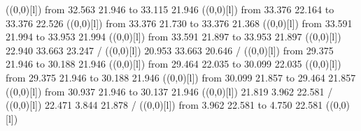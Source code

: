 {%
\linethickness=1pt
\setplotsymbol ({\makebox(0,0)[l]{\tencirc{}}})
{\color[rgb]{0,0,0}\putrule from 32.563 21.946 to 33.115 21.946
}%
%
%
\linethickness=1pt
\setplotsymbol ({\makebox(0,0)[l]{\tencirc{}}})
{\color[rgb]{0,0,0}\putrule from 33.376 22.164 to 33.376 22.526
}%
%
%
\linethickness=1pt
\setplotsymbol ({\makebox(0,0)[l]{\tencirc{}}})
{\color[rgb]{0,0,0}\putrule from 33.376 21.730 to 33.376 21.368
}%
%
%
\linethickness=1pt
\setplotsymbol ({\makebox(0,0)[l]{\tencirc{}}})
{\color[rgb]{0,0,0}\putrule from 33.591 21.994 to 33.953 21.994
}%
%
%
\linethickness=1pt
\setplotsymbol ({\makebox(0,0)[l]{\tencirc{}}})
{\color[rgb]{0,0,0}\putrule from 33.591 21.897 to 33.953 21.897
}%
%
%
\linethickness=1pt
\setplotsymbol ({\makebox(0,0)[l]{\tencirc{}}})
{\color[rgb]{0,0,0} 22.940 33.663 23.247 /
}%
%
%
\linethickness=1pt
\setplotsymbol ({\makebox(0,0)[l]{\tencirc{}}})
{\color[rgb]{0,0,0} 20.953 33.663 20.646 /
}%
%
%
\linethickness=1pt
\setplotsymbol ({\makebox(0,0)[l]{\tencirc{}}})
{\color[rgb]{0,0,0}\putrule from 29.375 21.946 to 30.188 21.946
}%
%
%
\linethickness=1pt
\setplotsymbol ({\makebox(0,0)[l]{\tencirc{}}})
{\color[rgb]{0,0,0}\putrule from 29.464 22.035 to 30.099 22.035
}%
%
%
\linethickness=1pt
\setplotsymbol ({\makebox(0,0)[l]{\tencirc{}}})
{\color[rgb]{0,0,0}\putrule from 29.375 21.946 to 30.188 21.946
}%
%
%
\linethickness=1pt
\setplotsymbol ({\makebox(0,0)[l]{\tencirc{}}})
{\color[rgb]{0,0,0}\putrule from 30.099 21.857 to 29.464 21.857
}%
%
%
\linethickness=1pt
\setplotsymbol ({\makebox(0,0)[l]{\tencirc{}}})
{\color[rgb]{0,0,0}\putrule from 30.937 21.946 to 30.137 21.946
}%
%
%
\linethickness=1pt
\setplotsymbol ({\makebox(0,0)[l]{\tencirc{}}})
{\color[rgb]{0,0,0} 21.819  3.962 22.581 /
}%
%
%
\linethickness=1pt
\setplotsymbol ({\makebox(0,0)[l]{\tencirc{}}})
{\color[rgb]{0,0,0} 22.471  3.844 21.878 /
}%
%
%
\linethickness=1pt
\setplotsymbol ({\makebox(0,0)[l]{\tencirc{}}})
{\color[rgb]{0,0,0}\putrule from  3.962 22.581 to  4.750 22.581
}%
%
%
\linethickness=1pt
\setplotsymbol ({\makebox(0,0)[l]{\tencirc{}}})
}
